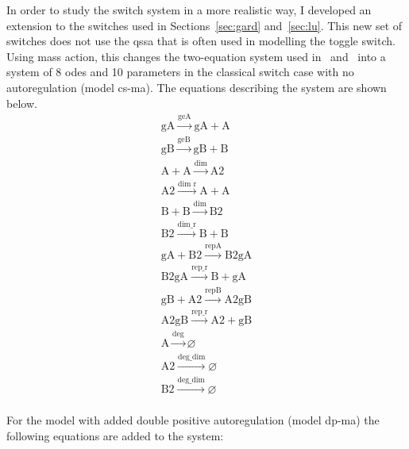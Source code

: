 In order to study the switch system in a more realistic way, I developed an extension to the switches used in Sections~\ref{sec:gard} and~\ref{sec:lu}. This new set of switches does not use the \acrfull{qssa} that is often used in modelling the toggle switch. Using mass action, this changes the two-equation system used in~\textcite{Gardner:2000vha} and~\textcite{Lu:2014kc} into a system of 8 \acrshort{ode}s and 10 parameters in the classical switch case with no autoregulation (model \acrshort{cs-ma}). The equations describing the system are shown below. 
$$
\begin{array}{cccc}
      \textrm{gA}\stackrel{\textrm{geA}}{\longrightarrow}\textrm{gA} + \textrm{A} \\
      \textrm{gB}\stackrel{\textrm{geB}}{\longrightarrow}\textrm{gB} + \textrm{B} \\
      \textrm{A} + \textrm{A} \stackrel{\textrm{dim}}{\longrightarrow}\textrm{A2} \\
      \textrm{A2} \stackrel{\textrm{dim r}}{\longrightarrow}\textrm{A} + \textrm{A} \\
      \textrm{B} + \textrm{B} \stackrel{\textrm{dim}}{\longrightarrow} \textrm{B2} \\
      \textrm{B2} \stackrel{\textrm{dim\_r}}{\longrightarrow}\textrm{B} + \textrm{B} \\
      \textrm{gA} + \textrm{B2} \stackrel{\textrm{repA}}{\longrightarrow}\textrm{B2gA} \\
      \textrm{B2gA} \stackrel{\textrm{rep\_r}}{\longrightarrow}\textrm{B} + \textrm{gA} \\
      \textrm{gB} + \textrm{A2} \stackrel{\textrm{repB}}{\longrightarrow}\textrm{A2gB} \\
      \textrm{A2gB} \stackrel{\textrm{rep\_r}}{\longrightarrow}\textrm{A2} + \textrm{gB} \\
      \textrm{A} \stackrel{\textrm{deg}}{\longrightarrow}\varnothing\\
      \textrm{A2} \stackrel{\textrm{deg\_dim}}{\longrightarrow} \varnothing\\
      \textrm{B2} \stackrel{\textrm{deg\_dim}}{\longrightarrow}\varnothing\\
\end{array}
$$

\noindent For the model with added double positive autoregulation (model \acrshort{dp-ma}) the following equations are added to the system: 

